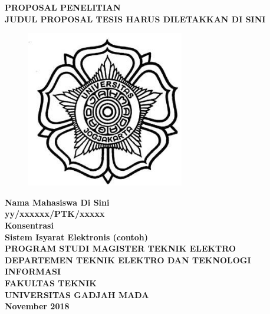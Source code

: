 \documentclass[12pt]{article}
\title{}
\begin{document}
\clearpage
\thispagestyle{empty}

\begin{center}
{ \LARGE \bfseries PROPOSAL PENELITIAN}\\[1.8cm]

{ \Large \bfseries JUDUL PROPOSAL TESIS HARUS DILETAKKAN DI SINI}\\[0.4cm]

\begin{figure}[!ht]
\centering
\includegraphics[width=195pt]{img-1.png}
\end{figure}

{ \large \bfseries Nama Mahasiswa Di Sini}\\[0.4cm]


{ \large \bfseries yy/xxxxxx/PTK/xxxxx}\\[1.4cm]

{ \large \bfseries Konsentrasi}\\[0.4cm]

{ \large \bfseries Sistem Isyarat Elektronis (contoh)}\\[2.4cm]

{ \large \bfseries PROGRAM STUDI MAGISTER TEKNIK ELEKTRO}\\[0.4cm]

{ \large \bfseries DEPARTEMEN TEKNIK ELEKTRO DAN TEKNOLOGI INFORMASI}\\[0.4cm]

{ \large \bfseries FAKULTAS TEKNIK}\\[0.4cm]

{ \large \bfseries UNIVERSITAS GADJAH MADA}\\[0.8cm]

\textbf{{\large November 2018}}
\end{center}
\pagebreak{}
\end{document}

